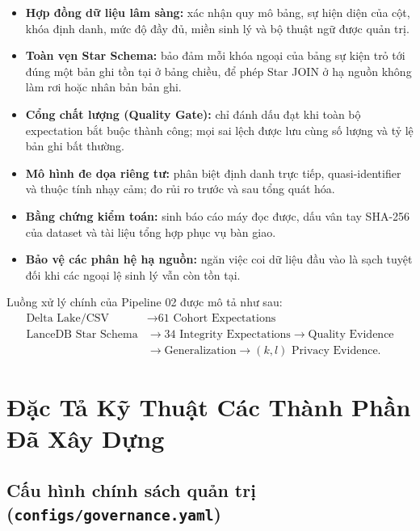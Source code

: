 \documentclass[11pt,a4paper]{article}
\renewcommand{\_}{\texorpdfstring{\origunderscore\allowbreak}{\origunderscore}}
\begin{document}
\begin{itemize}
    \item \textbf{Hợp đồng dữ liệu lâm sàng:} xác nhận quy mô bảng, sự hiện diện của cột, khóa định danh, mức độ đầy đủ, miền sinh lý và bộ thuật ngữ được quản trị.
    \item \textbf{Toàn vẹn Star Schema:} bảo đảm mỗi khóa ngoại của bảng sự kiện trỏ tới đúng một bản ghi tồn tại ở bảng chiều, để phép Star JOIN ở hạ nguồn không làm rơi hoặc nhân bản bản ghi.
    \item \textbf{Cổng chất lượng (Quality Gate):} chỉ đánh dấu đạt khi toàn bộ expectation bắt buộc thành công; mọi sai lệch được lưu cùng số lượng và tỷ lệ bản ghi bất thường.
    \item \textbf{Mô hình đe dọa riêng tư:} phân biệt định danh trực tiếp, quasi-identifier và thuộc tính nhạy cảm; đo rủi ro trước và sau tổng quát hóa.
    \item \textbf{Bằng chứng kiểm toán:} sinh báo cáo máy đọc được, dấu vân tay SHA-256 của dataset và tài liệu tổng hợp phục vụ bàn giao.
    \item \textbf{Bảo vệ các phân hệ hạ nguồn:} ngăn việc coi dữ liệu đầu vào là sạch tuyệt đối khi các ngoại lệ sinh lý vẫn còn tồn tại.
\end{itemize}

Luồng xử lý chính của Pipeline 02 được mô tả như sau:
\begin{align*}
\text{Delta Lake/CSV} &\longrightarrow \text{61 Cohort Expectations} \\
\text{LanceDB Star Schema} &\longrightarrow \text{34 Integrity Expectations}
\longrightarrow \text{Quality Evidence} \\
&\longrightarrow \text{Generalization}
\longrightarrow (k,l)\text{ Privacy Evidence}.
\end{align*}

\section{Đặc Tả Kỹ Thuật Các Thành Phần Đã Xây Dựng}

\subsection{Cấu hình chính sách quản trị (\texttt{configs/governance.yaml})}
\end{document}
